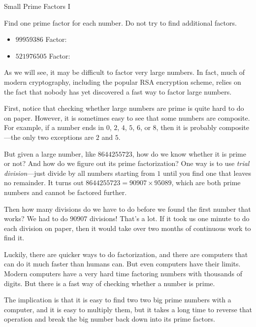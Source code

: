 \documentclass[a4paper,10pt]{report}
\begin{document}
\begin{problem}{Small Prime Factors I}

 Find one prime factor for each number. Do not try to find additional factors.

 \begin{itemize}
  \item \(99959386\) \hfill Factor: 
  \item \(521976505\) \hfill Factor: 
 \end{itemize}

\end{problem}

As we will see, it may be difficult to factor very large numbers. In fact, much
of modern cryptography, including the popular RSA encryption scheme, relies on
the fact that nobody has yet discovered a fast way to factor large numbers.

First, notice that checking whether large numbers are prime is quite hard to do
on paper. However, it is sometimes easy to see that some numbers are composite.
For example, if a number ends in \(0\), \(2\), \(4\), \(5\), \(6\), or \(8\),
then it is probably composite---the only two exceptions are \(2\) and \(5\).

But given a large number, like \(8644255723\), how do we know whether it is
prime or not? And how do we figure out its prime factorization? One way is to
use \emph{trial division}---just divide by all numbers starting from \(1\)
until you find one that leaves no remainder. It turns out \(8644255723 =
90907\times95089\), which are both prime numbers and cannot be factored
further.

Then how many divisions do we have to do before we found the first number that
works? We had to do \(90907\) divisions! That's a lot. If it took us one minute
to do each division on paper, then it would take over two months of continuous
work to find it.

Luckily, there are quicker ways to do factorization, and there are computers
that can do it much faster than humans can. But even computers have their
limits. Modern computers have a very hard time factoring numbers with thousands
of digits. But there is a fast way of checking whether a number is prime.

The implication is that it is easy to find two two big prime numbers with a
computer, and it is easy to multiply them, but it takes a long time to reverse
that operation and break the big number back down into its prime factors.
\end{document}
